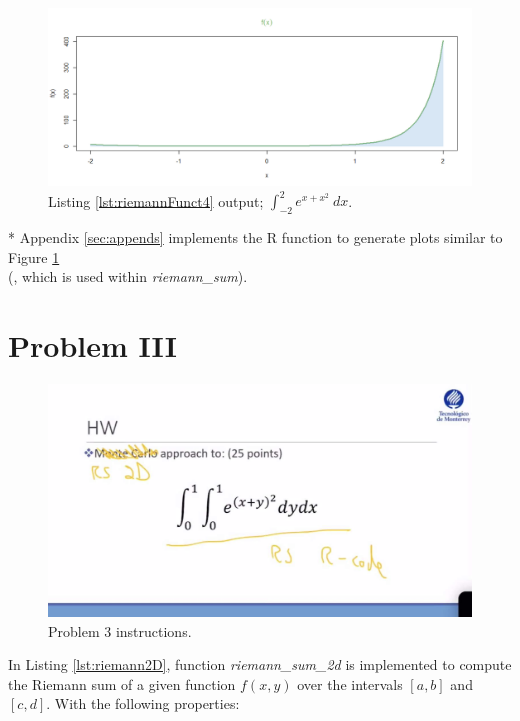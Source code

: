 \documentclass[11pt,a4paper]{article}
\begin{document}
\begin{figure}[!h]
\centering
\includegraphics[width=\textwidth]{./img/ExpOfxplusxsqr.png}
\caption{Listing \ref{lst:riemannFunct4} output; $ \int_{-2}^{2} e^{x+x^2} \ dx $.\label{fig:plotArea}}
\end{figure}

* Appendix \ref{sec:appends} implements the R function to generate plots similar to Figure \ref{fig:plotArea} \\ (, which is used within \emph{riemann\_sum}).

\clearpage

\section{Problem III}\label{sec:p3}

\begin{figure}[!h]
\centering
\includegraphics[width=\textwidth]{./img/instructionsP3.jpg}
\caption{Problem 3 instructions.\label{fig:P3inst}}
\end{figure}

In Listing \ref{lst:riemann2D}, function \emph{riemann\_sum\_2d} is implemented to compute the Riemann sum of a given function $ f(x,y) $ over the intervals $ [a,b] $ and $ [c,d] $. With the following properties:\\
\end{document}
